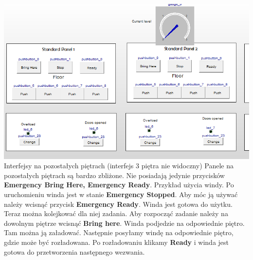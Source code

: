\documentclass[a4paper,11pt]{article}
\begin{document}
\includegraphics{images/rGuiStd.PNG} Interfejsy na pozostałych piętrach (interfejs 3 piętra nie widoczny)
Panele na pozostałych piętrach są bardzo zbliżone. Nie posiadają jedynie przycisków \textbf{Emergency Bring Here, Emergency Ready}.
Przykład użycia windy.
Po uruchomieniu winda jest w stanie \textbf{Emergency Stopped}. Aby móc ją używać należy wcisnąć przycisk \textbf{Emergency Ready}.
Winda jest gotowa do użytku. Teraz można kolejkować dla niej zadania.
Aby rozpocząć zadanie należy na dowolnym piętrze wcisnąć \textbf{Bring here}. Winda podjedzie na odpowiednie piętro.
Tam można ją załadować. Następnie posyłamy windę na odpowiednie piętro, gdzie może być rozładowana. 
Po rozładowaniu klikamy \textbf{Ready} i winda jest gotowa do przetworzenia następnego wezwania.
\end{document}
